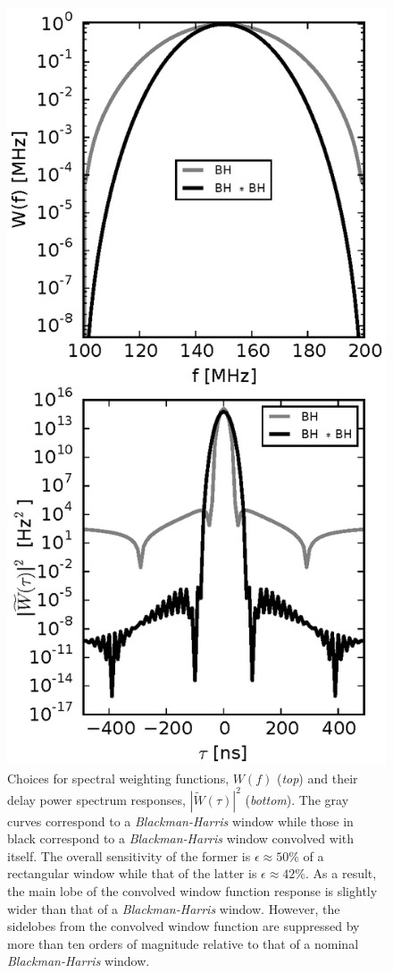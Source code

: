 \documentclass[preprint2,iop,numberedappendix,twocolappendix,appendixfloats]{emulateapj}
\begin{document}
\begin{figure}[htb]
  \centering
  \includegraphics[width=\linewidth]{window_function_modifications.eps}
  \caption{Choices for spectral weighting functions, $W(f)$ ({\it top}) and their delay power spectrum responses, $|\widetilde{W}(\tau)|^2$ ({\it bottom}). The gray curves correspond to a {\it Blackman-Harris} window while those in black correspond to a {\it Blackman-Harris} window convolved with itself. The overall sensitivity of the former is $\epsilon \approx 50\%$ of a rectangular window while that of the latter is $\epsilon \approx 42\%$. As a result, the main lobe of the convolved window function response is slightly wider than that of a {\it Blackman-Harris} window. However, the sidelobes from the convolved window function are suppressed by more than ten orders of magnitude relative to that of a nominal {\it Blackman-Harris} window.}
  \label{fig:window-functions}
\end{figure}
\end{document}
